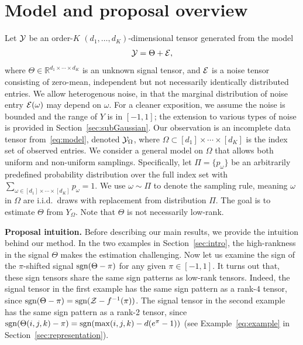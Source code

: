\documentclass[twoside,11pt]{article}
\theoremstyle{plain}
\theoremstyle{definition}
\def\sign{\textup{sgn}}
\begin{document}
\section{Model and proposal overview}\label{sec:overview}
Let $\mathcal{Y}$ be an order-$K$ $(d_1,\ldots,d_K)$-dimensional tensor generated from the model
\begin{equation}\label{eq:model}
\mathcal{Y}=\Theta+\mathcal{E},
\end{equation}
where $\Theta\in\mathbb{R}^{d_1\times \cdots \times d_K}$ is an unknown signal tensor, and $\mathcal{E}$ is a noise tensor consisting of zero-mean, independent but not necessarily identically distributed entries. We allow heterogenous noise, in that the marginal distribution of noise entry $\mathcal{E}(\omega)$ may depend on $\omega$. For a cleaner exposition, we assume the noise is bounded and the range of $Y$ is in $[-1,1]$; the extension  to various types of noise is provided in Section~\ref{sec:subGaussian}. Our observation is an incomplete data tensor from~\eqref{eq:model}, denoted  $\mathcal{Y}_\Omega$, where $\Omega\subset[d_1]\times\cdots\times[d_K]$ is the index set of observed entries. We consider a general model on $\Omega$ that allows both uniform and non-uniform samplings. Specifically, let $\Pi=\{p_\omega\}$ be an arbitrarily predefined probability distribution over the full index set with $\sum_{\omega\in[d_1]\times \cdots \times [d_K]}p_\omega=1$. We use $\omega\sim \Pi$ to denote the sampling rule, meaning $\omega$ in $\Omega$ are i.i.d.\ draws with replacement from distribution $\Pi$. The goal is to estimate $\Theta$ from $Y_{\Omega}$. Note that $\Theta$ is not necessarily low-rank. 

{\bf Proposal intuition.} Before describing our main results, we provide the intuition behind our method. In the two examples in Section~\ref{sec:intro}, the high-rankness in the signal $\Theta$ makes the estimation challenging. Now let us examine the sign of the $\pi$-shifted signal $\sign(\Theta-\pi)$ for any given $\pi\in[-1,1]$. It turns out that, these sign tensors share the same sign patterns as low-rank tensors. Indeed, the signal tensor in the first example has the same sign pattern as a rank-$4$ tensor, since $\sign(\Theta-\pi)=\sign(\tZ-f^{-1}(\pi))$. The signal tensor in the second example has the same sign pattern as a rank-2 tensor, since $\sign(\Theta(i,j,k)-\pi)=\sign(\max(i,j,k)-d(e^{\pi}-1))$ (see Example~\ref{eq:example} in Section~\ref{sec:representation}).
\end{document}
